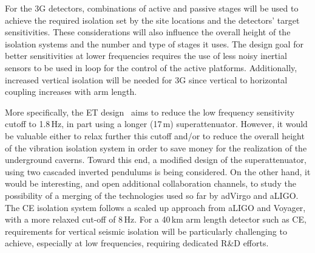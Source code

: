 
 For the 3G detectors, combinations of active and passive stages will be used to achieve the required isolation set by the site locations and the detectors' target sensitivities.
These considerations will also influence the overall height of the isolation systems and the number and type of stages it uses.
The design goal for better sensitivities at lower frequencies requires the use of less noisy inertial sensors to be used in loop for the control of the active platforms.
Additionally, increased vertical isolation will be needed for 3G since vertical to horizontal coupling increases with arm length. 

More specifically, the ET design~\cite{ET2011} aims to reduce the low frequency sensitivity cutoff to 1.8\,Hz, in part using a longer (17\,m) superattenuator. However, it would be valuable either to relax further this cutoff and/or to reduce the overall height of the vibration isolation system in order to save money for the realization of the underground caverns. Toward this end, a modified design of the superattenuator, using two cascaded inverted pendulums is being considered. On the other hand, it would be interesting, and open additional collaboration channels, to study the possibility of a merging of the technologies used so far by adVirgo and aLIGO. 
The CE isolation system follows a scaled up approach from aLIGO and Voyager, with a more relaxed cut-off of 8\,Hz. For a 40\,km arm length detector such as CE, requirements for vertical seismic isolation will be particularly challenging to achieve, especially at low frequencies, requiring dedicated R\&D efforts.

